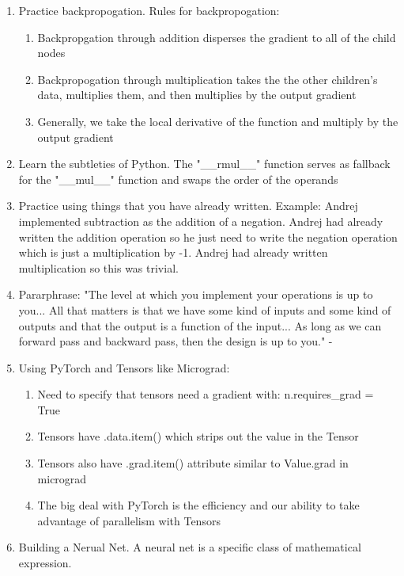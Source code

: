 \documentclass[a4paper, 11pt, oneside]{researchjournal} %
\begin{document}
\begin{enumerate}
    \item Practice backpropogation. Rules for backpropogation: 
    \begin{enumerate}
        \item Backpropgation through addition disperses the gradient to all of the child nodes
        \item Backpropogation through multiplication takes the the other children's data, multiplies them, and then multiplies by the output gradient
        \item Generally, we take the local derivative of the function and multiply by the output gradient
    \end{enumerate}
    \item Learn the subtleties of Python. The "\_\_rmul\_\_" function serves as fallback for the "\_\_mul\_\_" function and swaps the order of the operands 
    \item Practice using things that you have already written. Example: Andrej implemented subtraction as the addition of a negation. Andrej had already written the addition operation so he just need to write the negation operation which is just a multiplication by -1. Andrej had already written multiplication so this was trivial.  
    \item Pararphrase: "The level at which you implement your operations is up to you... All that matters is that we have some kind of inputs and some kind of outputs and that the output is a function of the input... As long as we can forward pass and backward pass, then the design is up to you." - \cite{AndrejKarpathyMicrogradVideo}
    \item Using PyTorch and Tensors like Micrograd:
    \begin{enumerate}
        \item Need to specify that tensors need a gradient with: n.requires\_grad = True
        \item Tensors have .data.item() which strips out the value in the Tensor
        \item Tensors also have .grad.item() attribute similar to Value.grad in micrograd
        \item The big deal with PyTorch is the efficiency and our ability to take advantage of parallelism with Tensors
    \end{enumerate}
    \item Building a Nerual Net. A neural net is a specific class of mathematical expression.
    \begin{enumerate}

\end{enumerate}
\end{enumerate}
\end{document}
